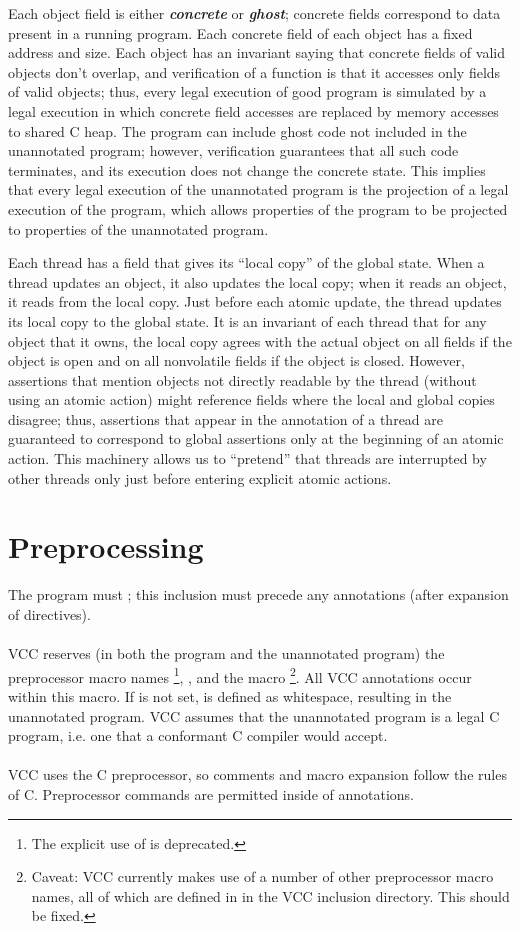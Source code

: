 \documentclass[preprint,nocopyrightspace]{sigplanconf}
\newcommand{\Def}[1]{\textit{\textbf{#1}}}
\begin{document}
Each object field is either \Def{concrete} or \Def{ghost}; concrete
fields correspond to data present in a running program.  Each concrete
field of each object has a fixed address and size.  Each object has an
invariant saying that concrete fields of valid objects don't
overlap, and verification of a function is that it accesses only
fields of valid objects; thus, every legal execution of good
program is simulated by a legal execution in which concrete field
accesses are replaced by memory accesses to shared C heap.  The
program can include ghost code not included in the unannotated
program; however, verification guarantees that all such code
terminates, and its execution does not change the concrete state.
This implies that every legal execution of the unannotated program is
the projection of a legal execution of the program, which allows
properties of the program to be projected to properties of the
unannotated program.

Each thread has a field that gives its ``local copy'' of the global state.
When a thread updates an object, it also updates the local copy;
when it reads an object, it reads from the local copy. 
Just before each atomic update, the thread updates its local copy to
the global state. It is an invariant of each thread that for any
object that it owns, the local copy agrees with the actual object on
all fields if the object is open and on all nonvolatile fields if the
object is closed. However, assertions that mention objects not
directly readable by the thread (without using an atomic action) might
reference fields where the local and global copies disagree; thus,
assertions that appear in the annotation of a thread are guaranteed to
correspond to global assertions only at the beginning of an atomic
action. This machinery allows us to ``pretend'' that threads are
interrupted by other threads only just before entering explicit atomic
actions. 

\section{Preprocessing}

The program must ; this inclusion must
precede any annotations (after expansion of 
directives). 
\\\\
VCC reserves (in both the program and the unannotated program) the
preprocessor macro names \footnote{ The explicit use
of  is deprecated.  }, , and the
macro \footnote{ Caveat: VCC currently makes use of a
number of other preprocessor macro names, all of which are defined
in  in the VCC inclusion directory. This should be
fixed.  }.  All VCC annotations occur within this
macro. If  is not set, \vcc{_()} is defined as whitespace,
resulting in the unannotated program. VCC assumes that the unannotated
program is a legal C program, i.e. one that a conformant C compiler
would accept.
\\\\
VCC uses the C preprocessor, so comments and macro expansion follow
the rules of C. Preprocessor commands are permitted inside of annotations.
\end{document}
